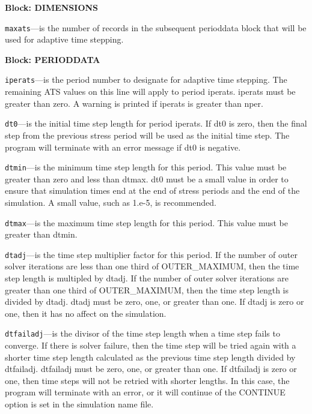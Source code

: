 
\item \textbf{Block: DIMENSIONS}

\begin{description}
\item \texttt{maxats}---is the number of records in the subsequent perioddata block that will be used for adaptive time stepping.

\end{description}
\item \textbf{Block: PERIODDATA}

\begin{description}
\item \texttt{iperats}---is the period number to designate for adaptive time stepping.  The remaining ATS values on this line will apply to period iperats.  iperats must be greater than zero.  A warning is printed if iperats is greater than nper.

\item \texttt{dt0}---is the initial time step length for period iperats.  If dt0 is zero, then the final step from the previous stress period will be used as the initial time step.  The program will terminate with an error message if dt0 is negative.

\item \texttt{dtmin}---is the minimum time step length for this period.  This value must be greater than zero and less than dtmax.  dt0 must be a small value in order to ensure that simulation times end at the end of stress periods and the end of the simulation.  A small value, such as 1.e-5, is recommended.

\item \texttt{dtmax}---is the maximum time step length for this period.  This value must be greater than dtmin.

\item \texttt{dtadj}---is the time step multiplier factor for this period.  If the number of outer solver iterations are less than one third of OUTER\_MAXIMUM, then the time step length is multipled by dtadj.  If the number of outer solver iterations are greater than one third of OUTER\_MAXIMUM, then the time step length is divided by dtadj.  dtadj must be zero, one, or greater than one.  If dtadj is zero or one, then it has no affect on the simulation.

\item \texttt{dtfailadj}---is the divisor of the time step length when a time step fails to converge.  If there is solver failure, then the time step will be tried again with a shorter time step length calculated as the previous time step length divided by dtfailadj.  dtfailadj must be zero, one, or greater than one.  If dtfailadj is zero or one, then time steps will not be retried with shorter lengths.  In this case, the program will terminate with an error, or it will continue of the CONTINUE option is set in the simulation name file.

\end{description}

